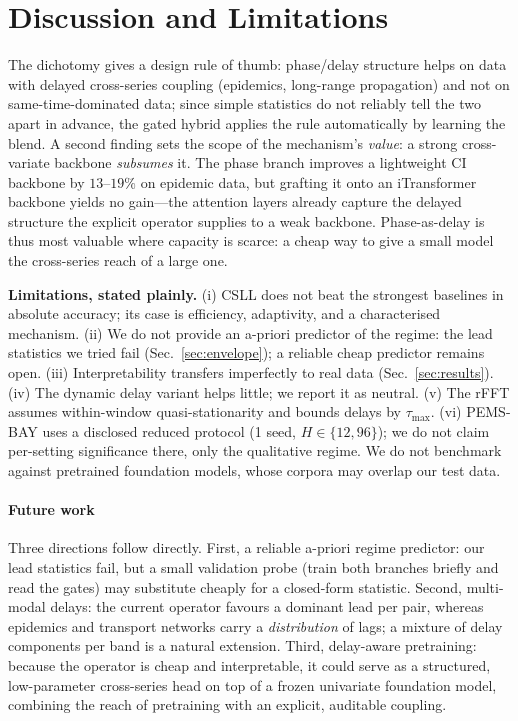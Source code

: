 \documentclass[journal,a4paper]{IEEEtran}
\begin{document}
\section{Discussion and Limitations}
\label{sec:discussion}
The dichotomy gives a design rule of thumb: phase/delay structure helps on data with delayed
cross-series coupling (epidemics, long-range propagation) and not on same-time-dominated data;
since simple statistics do not reliably tell the two apart in advance, the gated hybrid applies the
rule automatically by learning the blend. A second finding sets the scope of the mechanism's
\emph{value}: a strong cross-variate backbone \emph{subsumes} it. The phase branch improves a
lightweight CI backbone by $13$--$19\%$ on epidemic data, but grafting it onto an iTransformer
backbone yields no gain---the attention layers already capture the delayed structure the explicit
operator supplies to a weak backbone. Phase-as-delay is thus most valuable where capacity is
scarce: a cheap way to give a small model the cross-series reach of a large one.

\textbf{Limitations, stated plainly.}
(i) CSLL does not beat the strongest baselines in absolute accuracy; its case is efficiency,
adaptivity, and a characterised mechanism.
(ii) We do not provide an a-priori predictor of the regime: the lead statistics we tried fail
(Sec.~\ref{sec:envelope}); a reliable cheap predictor remains open.
(iii) Interpretability transfers imperfectly to real data (Sec.~\ref{sec:results}).
(iv) The dynamic delay variant helps little; we report it as neutral.
(v) The rFFT assumes within-window quasi-stationarity and bounds delays by $\tau_{\max}$.
(vi) PEMS-BAY uses a disclosed reduced protocol (1 seed, $H\in\{12,96\}$); we do not claim
per-setting significance there, only the qualitative regime. We do not benchmark against pretrained
foundation models, whose corpora may overlap our test data.

\paragraph{Future work} Three directions follow directly. First, a reliable a-priori regime
predictor: our lead statistics fail, but a small validation probe (train both branches briefly and
read the gates) may substitute cheaply for a closed-form statistic. Second, multi-modal delays: the
current operator favours a dominant lead per pair, whereas epidemics and transport networks carry a
\emph{distribution} of lags; a mixture of delay components per band is a natural extension. Third,
delay-aware pretraining: because the operator is cheap and interpretable, it could serve as a
structured, low-parameter cross-series head on top of a frozen univariate foundation model,
combining the reach of pretraining with an explicit, auditable coupling.
\end{document}
